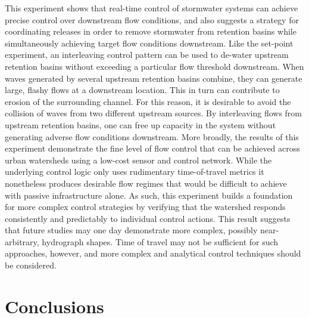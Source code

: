 This experiment shows that real-time control of stormwater systems can achieve precise control over downstream flow conditions, and also suggests a strategy for coordinating releases in order to remove stormwater from retention basins while simultaneously achieving target flow conditions downstream. Like the set-point experiment, an interleaving control pattern can be used to de-water upstream retention basins without exceeding a particular flow threshold downstream. When waves generated by several upstream retention basins combine, they can generate large, flashy flows at a downstream location.
This in turn can contribute to erosion of the surrounding channel. For this reason, it is desirable to avoid the collision of waves from two different upstream sources. By interleaving flows from upstream retention basins, one can free up capacity in the system without generating adverse flow conditions downstream. More broadly, the results of this experiment demonstrate the fine level of flow control that can be achieved across urban watersheds using a low-cost sensor and control network. While the underlying control logic only uses rudimentary time-of-travel metrics it nonetheless produces desirable flow regimes that would be difficult to achieve with passive infrastructure alone. As such, this experiment builds a foundation for more complex control strategies by verifying that the watershed responds consistently and predictably to individual control actions. This result suggests that future studies may one day demonstrate more complex, possibly near-arbitrary, hydrograph shapes. Time of travel may not be sufficient for such approaches, however, and more complex and analytical control techniques should be considered. 

\section{Conclusions}

